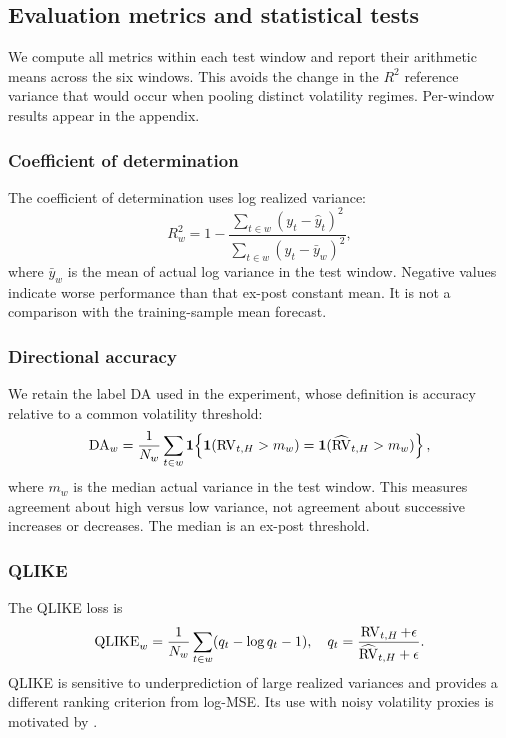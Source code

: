 \subsection{Evaluation metrics and statistical tests}\label{sec:metrics}
We compute all metrics within each test window and report their
arithmetic means across the six windows. This avoids the change in
the $R^2$ reference variance that would occur when pooling distinct
volatility regimes. Per-window results appear in the appendix.

\subsubsection{Coefficient of determination}
The coefficient of determination uses log realized variance:
\begin{equation}
 R_w^2=1-\frac{\sum_{t\in w}(y_t-\hat y_t)^2}
                   {\sum_{t\in w}(y_t-\bar y_w)^2},\label{eq:r2}
\end{equation}
where $\bar y_w$ is the mean of actual log variance in the test window.
Negative values indicate worse performance than that ex-post constant
mean. It is not a comparison with the training-sample mean forecast.

\subsubsection{Directional accuracy}
We retain the label DA used in the experiment, whose definition is
accuracy relative to a common volatility threshold:
\begin{equation}
 \mathrm{DA}_w=\frac1{N_w}\sum_{t\in w}\mathbf1\!
 \left\{\mathbf1(\operatorname{RV}_{t,H}>m_w)=
          \mathbf1(\widehat{\operatorname{RV}}_{t,H}>m_w)\right\},\label{eq:da}
\end{equation}
where $m_w$ is the median actual variance in the test window. This
measures agreement about high versus low variance, not agreement about
successive increases or decreases. The median is an ex-post threshold.

\subsubsection{QLIKE}
The QLIKE loss is
\begin{equation}
 \mathrm{QLIKE}_w=\frac1{N_w}\sum_{t\in w}(q_t-\log q_t-1),\quad
 q_t=\frac{\operatorname{RV}_{t,H}+\epsilon}{\widehat{\operatorname{RV}}_{t,H}+\epsilon}.
 \label{eq:qlike}
\end{equation}
QLIKE is sensitive to underprediction of large realized variances and
provides a different ranking criterion from log-MSE. Its use with
noisy volatility proxies is motivated by \citet{Patton_2011}.

